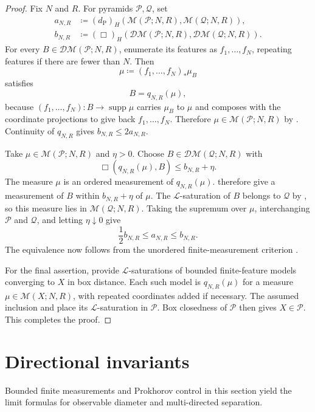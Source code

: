 \documentclass{amsart}
\theoremstyle{plain}
\theoremstyle{definition}
\theoremstyle{remark}
\newcommand{\M}{\mathcal{M}}
\newcommand{\DM}{\mathcal{DM}}
\renewcommand{\L}{\mathcal{L}}
\DeclareMathOperator{\supp}{supp}
\newcommand{\dpr}{d_{\operatorname{P}}}
\newcommand{\haus}[1]{\left(#1\right)_H}
\begin{document}
\begin{proof}
Fix $N$ and $R$.  For pyramids $\mathcal P,\mathcal Q$, set
\[
\begin{aligned}
a_{N,R}&\coloneqq\haus{\dpr}(\M(\mathcal P;N,R),\M(\mathcal Q;N,R)),\\
b_{N,R}&\coloneqq\haus{\Box}(\DM(\mathcal P;N,R),\DM(\mathcal Q;N,R)).
\end{aligned}
\]
For every $B\in\DM(\mathcal P;N,R)$, enumerate its features as
$f_1,\ldots,f_N$, repeating features if there are fewer than $N$.  Then
\[
\mu\coloneqq(f_1,\ldots,f_N)_*\mu_B
\]
satisfies
\[
B=q_{N,R}(\mu),
\]
because $(f_1,\ldots,f_N)\colon B\to\supp\mu$ carries $\mu_B$ to $\mu$ and
composes with the coordinate projections to give back $f_1,\ldots,f_N$.
Therefore
$\mu\in\M(\mathcal P;N,R)$ by
.  Continuity of $q_{N,R}$ gives
$b_{N,R}\leq2a_{N,R}$.

Take $\mu\in\M(\mathcal P;N,R)$ and $\eta>0$.  Choose
$B\in\DM(\mathcal Q;N,R)$ with
\[\Box(q_{N,R}(\mu),B)\leq b_{N,R}+\eta.\]
The measure $\mu$ is an ordered measurement of $q_{N,R}(\mu)$.
therefore give a measurement of $B$ within $b_{N,R}+\eta$ of $\mu$.
The $\L$-saturation of $B$ belongs to $\mathcal Q$ by
, so this measure lies in
$\M(\mathcal Q;N,R)$.  Taking the supremum over $\mu$, interchanging
$\mathcal P$ and $\mathcal Q$, and letting $\eta\downarrow0$ give
\[\frac12b_{N,R}\leq a_{N,R}\leq b_{N,R}.\]
The equivalence now follows from the unordered finite-measurement criterion
\cite[Proposition~7.2]{gds2}.

For the final assertion, \cite[Lemmas~4.8 and~4.9]{gds2} provide
$\L$-saturations of bounded finite-feature models converging to $X$ in box
distance.  Each such model is $q_{N,R}(\mu)$ for a measure
$\mu\in\M(X;N,R)$, with repeated coordinates added if necessary.  The
assumed inclusion and  place its
$\L$-saturation in $\mathcal P$.  Box closedness of $\mathcal P$ then gives
$X\in\mathcal P$.  This completes the proof.
\end{proof}

\section{Directional invariants}
\label{sec:directional-invariants}

Bounded finite measurements and Prokhorov control in this section yield the
limit formulas for observable diameter and multi-directed separation.
\end{document}
